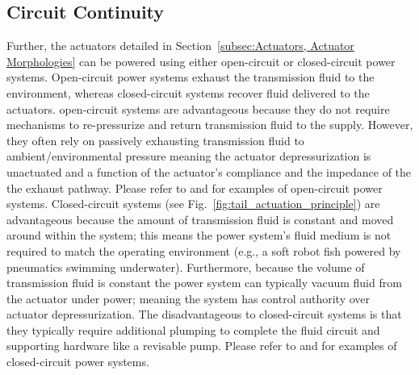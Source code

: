 \subsection{Circuit Continuity}
Further, the actuators detailed in Section~\ref{subsec:Actuators, Actuator Morphologies} can be powered using either open-circuit or closed-circuit power systems.
Open-circuit power systems exhaust the transmission fluid to the environment, whereas closed-circuit systems recover fluid delivered to the actuators.
open-circuit systems are advantageous because they do not require mechanisms to re-pressurize and return transmission fluid to the supply.
However, they often rely on passively exhausting transmission fluid to ambient/environmental pressure meaning the actuator depressurization is unactuated and a function of the actuator's compliance and the impedance of the the exhaust pathway.
Please refer to \citet{marchese2011soft} and \citet{marchese2014autonomous} for examples of open-circuit power systems.
Closed-circuit systems (see Fig.~\ref{fig:tail_actuation_principle}) are advantageous because the amount of transmission fluid is constant and moved around within the system; this means the power system's fluid medium is not required to match the operating environment (e.g., a soft robot fish powered by pneumatics swimming underwater).
Furthermore, because the volume of transmission fluid is constant the power system can typically vacuum fluid from the actuator under power; meaning the system has control authority over actuator depressurization.
The disadvantageous to closed-circuit systems is that they typically require additional plumping to complete the fluid circuit and supporting hardware like a revisable pump.
Please refer to \cite{marchese2014design, katzschmann2014hydraulic} and \cite{marchese2015design} for examples of closed-circuit power systems.

